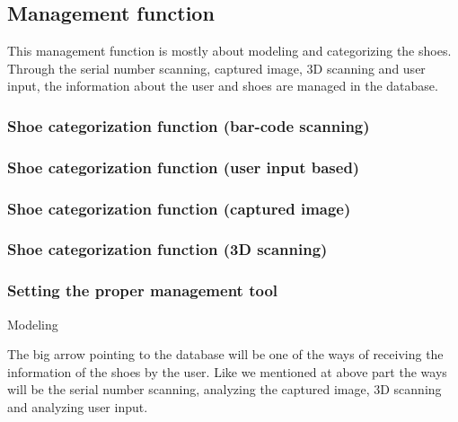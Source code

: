 \documentclass[conference]{IEEEtran}
\begin{document}
\subsection{Management function}
This management function is mostly about modeling and categorizing the shoes. Through the serial number scanning, captured image, 3D scanning and user input, the information about the user and shoes are managed in the database. 
\subsubsection{Shoe categorization function (bar-code scanning)}
\subsubsection{Shoe categorization function (user input based)}
\subsubsection{Shoe categorization function (captured image)}
\subsubsection{Shoe categorization function (3D scanning)}
\subsubsection{Setting the proper management tool}Modeling

The big arrow pointing to the database will be one of the ways of receiving the information of the shoes by the user. Like we mentioned at above part the ways will be the serial number scanning, analyzing the captured image, 3D scanning and analyzing user input.
\end{document}
